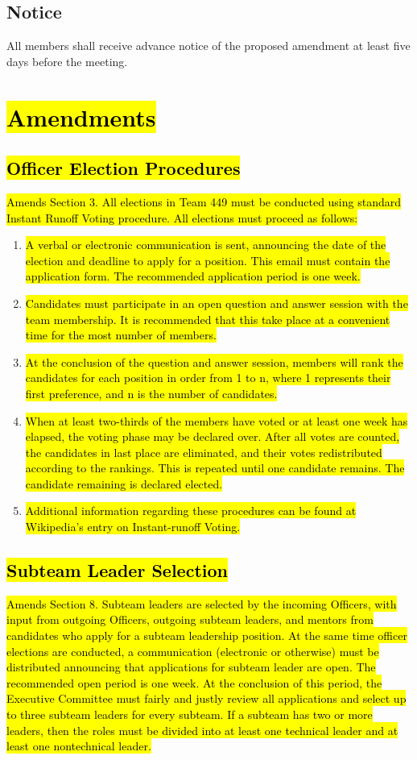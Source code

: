 \documentclass[12pt, a4paper]{article}
\begin{document}
\subsection{Notice}
All members shall receive advance notice of the proposed amendment at least five days before the meeting. 

\section{\hl{Amendments}}
\subsection{\hl{Officer Election Procedures}}
\hl{Amends Section 3. 
All elections in Team 449 must be conducted using standard Instant Runoff Voting procedure. All elections must proceed as follows:}
\begin{enumerate}
\item \hl{A verbal or electronic communication is sent, announcing the date of the election and deadline to apply for a position. This email must contain the application form. The recommended application period is one week.}
\item \hl{Candidates must participate in an open question and answer session with the team membership. It is recommended that this take place at a convenient time for the most number of members.}
\item \hl{At the conclusion of the question and answer session, members will rank the candidates for each position in order from 1 to n, where 1 represents their first preference, and n is the number of candidates. }
\item \hl{When at least two-thirds of the members have voted or at least one week has elapsed, the voting phase may be declared over. After all votes are counted, the candidates in last place are eliminated, and their votes redistributed according to the rankings. This is repeated until one candidate remains. The candidate remaining is declared elected.}
\item \hl{Additional information regarding these procedures can be found at Wikipedia's entry on Instant-runoff Voting.}
\end{enumerate}

\subsection{\hl{Subteam Leader Selection}}
\hl{Amends Section 8. Subteam leaders are selected by the incoming Officers, with input from outgoing Officers, outgoing subteam leaders, and mentors from candidates who apply for a subteam leadership position. 
At the same time officer elections are conducted, a communication (electronic or otherwise) must be distributed announcing that applications for subteam leader are open. 
The recommended open period is one week. 
At the conclusion of this period, the Executive Committee must fairly and justly review all applications and select up to three subteam leaders for every subteam. 
If a subteam has two or more leaders, then the roles must be divided into at least one technical leader and at least one nontechnical leader.}
\end{document}
